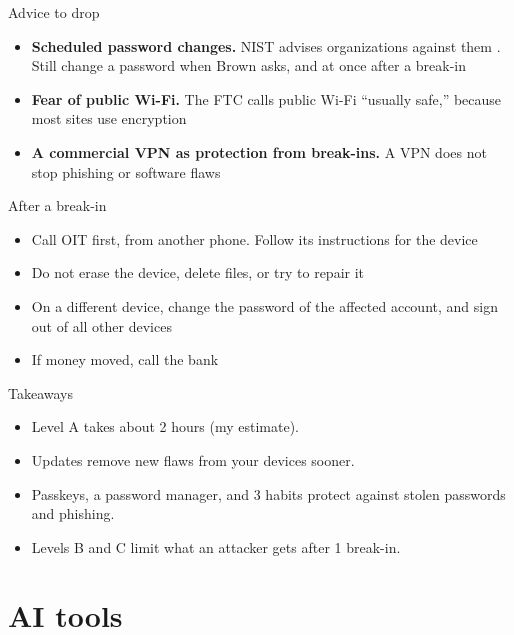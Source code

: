 \documentclass[11pt]{beamer}
\newcommand{\vfy}{\unskip}
\newcommand{\vfy}{\unskip\nobreakspace{\scriptsize\textcolor{citecol}{[verify]}}}
\begin{document}
\begin{frame}{Advice to drop}
\pause
\begin{itemize}\setlength\itemsep{12pt}
\item \textbf{Scheduled password changes.} NIST advises organizations against them \vfy. Still change a password when Brown asks, and at once after a break-in \pause
\item \textbf{Fear of public Wi-Fi.} The FTC calls public Wi-Fi ``usually safe,'' because most sites use encryption \vfy \pause
\item \textbf{A commercial VPN as protection from break-ins.} A VPN does not stop phishing or software flaws
\end{itemize}
\end{frame}


\begin{frame}{After a break-in}
\pause
\begin{itemize}\setlength\itemsep{9pt}
\item Call OIT first, from another phone. Follow its instructions for the device \pause
\item Do not erase the device, delete files, or try to repair it \pause
\item On a different device, change the password of the affected account, and sign out of all other devices \pause
\item If money moved, call the bank
\end{itemize}
\end{frame}


\begin{frame}{Takeaways}
\vfill
\pause
\begin{itemize}\setlength\itemsep{14pt}
\item Level A takes about 2 hours (my estimate). \pause
\item Updates remove new flaws from your devices sooner. \pause
\item Passkeys, a password manager, and 3 habits protect against stolen passwords and phishing. \pause
\item Levels B and C limit what an attacker gets after 1 break-in.
\end{itemize}
\vfill
\end{frame}


\section{AI tools}
\end{document}
